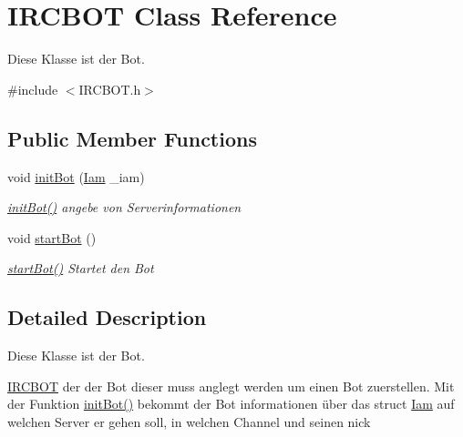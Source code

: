 \hypertarget{classIRCBOT}{\section{\-I\-R\-C\-B\-O\-T \-Class \-Reference}
\label{classIRCBOT}
}


\-Diese \-Klasse ist der \-Bot.  




{\ttfamily \#include $<$\-I\-R\-C\-B\-O\-T.\-h$>$}

\subsection*{\-Public \-Member \-Functions}
\begin{DoxyCompactItemize}
\item 
void \hyperlink{classIRCBOT_aa3905a0ab4b6987f87aa45a859badac0}{init\-Bot} (\hyperlink{structIam}{\-Iam} \-\_\-iam)
\begin{DoxyCompactList}\small\item\em \hyperlink{classIRCBOT_aa3905a0ab4b6987f87aa45a859badac0}{init\-Bot()} angebe von \-Serverinformationen \end{DoxyCompactList}\item 
void \hyperlink{classIRCBOT_a9de9d5e1a5dcbb82669cea8d7de0d5cb}{start\-Bot} ()
\begin{DoxyCompactList}\small\item\em \hyperlink{classIRCBOT_a9de9d5e1a5dcbb82669cea8d7de0d5cb}{start\-Bot()} \-Startet den \-Bot \end{DoxyCompactList}\end{DoxyCompactItemize}


\subsection{\-Detailed \-Description}
\-Diese \-Klasse ist der \-Bot. 

\hyperlink{classIRCBOT}{\-I\-R\-C\-B\-O\-T} der der \-Bot dieser muss anglegt werden um einen \-Bot zuerstellen. \-Mit der \-Funktion \hyperlink{classIRCBOT_aa3905a0ab4b6987f87aa45a859badac0}{init\-Bot()} bekommt der \-Bot informationen über das struct \hyperlink{structIam}{\-Iam} auf welchen \-Server er gehen soll, in welchen \-Channel und seinen nick 


